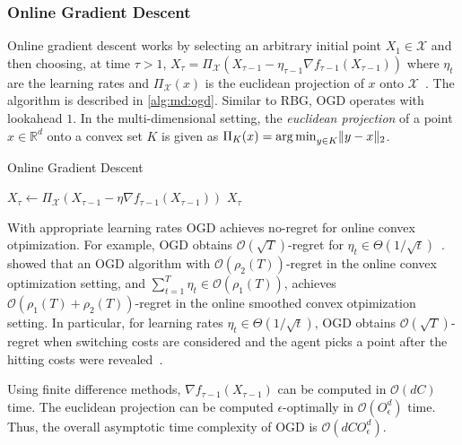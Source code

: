 \subsubsection{Online Gradient Descent}

Online gradient descent works by selecting an arbitrary initial point $X_1 \in \mathcal{X}$ and then choosing, at time $\tau > 1$, $X_{\tau} = \Pi_{\mathcal{X}}(X_{\tau-1} - \eta_{\tau-1} \nabla f_{\tau-1}(X_{\tau-1}))$ where $\eta_t$ are the learning rates and $\Pi_{\mathcal{X}}(x)$ is the euclidean projection of $x$ onto $\mathcal{X}$~\cite{Andrew2015}. The algorithm is described in \cref{alg:md:ogd}. Similar to RBG, OGD operates with lookahead $1$. In the multi-dimensional setting, the \emph{euclidean projection} of a point $x \in \mathbb{R}^d$ onto a convex set $K$ is given as $\Pi_{K}(x) = \operatorname*{arg\,min}_{y \in K} \lVert y - x\rVert_2$.

\begin{algorithm}
    \caption{Online Gradient Descent~\cite{Andrew2015}}\label{alg:md:ogd}
    $X_{\tau} \gets \Pi_{\mathcal{X}}(X_{\tau-1} - \eta \nabla f_{\tau-1}(X_{\tau-1}))$\;
    \Return $X_{\tau}$\;
\end{algorithm}

With appropriate learning rates OGD achieves no-regret for online convex otpimization. For example, OGD obtains $\mathcal{O}(\sqrt{T})$-regret for $\eta_t \in \Theta(1 / \sqrt{t})$~\cite{Andrew2015}. \citeauthor*{Andrew2015}~\cite{Andrew2015} showed that an OGD algorithm with $\mathcal{O}(\rho_2(T))$-regret in the online convex optimization setting, and $\sum_{t=1}^T \eta_t \in \mathcal{O}(\rho_1(T))$, achieves $\mathcal{O}(\rho_1(T) + \rho_2(T))$-regret in the online smoothed convex otpimization setting. In particular, for learning rates $\eta_t \in \Theta(1 / \sqrt{t})$, OGD obtains $\mathcal{O}(\sqrt{T})$-regret when switching costs are considered and the agent picks a point after the hitting costs were revealed~\cite{Andrew2015}.

Using finite difference methods, $\nabla f_{\tau-1}(X_{\tau-1})$ can be computed in $\mathcal{O}(d C)$ time. The euclidean projection can be computed $\epsilon$-optimally in $\mathcal{O}(O_{\epsilon}^d)$ time. Thus, the overall asymptotic time complexity of OGD is $\mathcal{O}(d C O_{\epsilon}^d)$.

